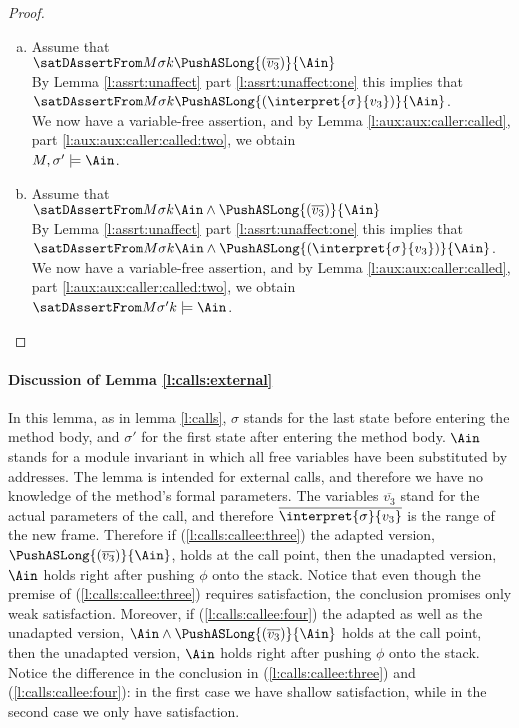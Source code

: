 \begin{proof}
\begin{enumerate}[a.]
\item
Assume that \\
$ \satDAssertFrom M  \sigma k    {\PushASLong  {(\overline {v_3})} {\Ain} }$\\
	By Lemma \ref{l:assrt:unaffect} part \ref{l:assrt:unaffect:one} this  implies that \\
$ \satDAssertFrom M  \sigma k    {\PushASLong  {(\interpret {\sigma} {v_3})} {\Ain} }$.\\
We now have a variable-free assertion, and by Lemma \ref{l:aux:aux:caller:called}, part \ref{l:aux:aux:caller:called:two}, we obtain\\
$ M,  \sigma'    \models \Ain$.
\item
Assume that \\
$ \satDAssertFrom M  \sigma k    {\Ain \wedge \PushASLong  {(\overline {v_3})} {\Ain} }$\\
	By Lemma \ref{l:assrt:unaffect} part \ref{l:assrt:unaffect:one} this  implies that \\
$ \satDAssertFrom M  \sigma k    {\Ain \wedge \PushASLong  {(\interpret {\sigma} {v_3})} {\Ain} }$.\\
We now have a variable-free assertion, and by Lemma \ref{l:aux:aux:caller:called}, part \ref{l:aux:aux:caller:called:two}, we obtain\\
$ \satDAssertFrom M  {\sigma'} k  \models \Ain$.
\end{enumerate}

\end{proof}

\paragraph{Discussion of Lemma \ref{l:calls:external}} In this lemma,  as in  lemma \ref{l:calls}, 
  $\sigma$ stands for the last state before entering the method body, and $\sigma'$ for the first state after entering the method body.
$\Ain$ stands for a module invariant in which all free variables have been substituted by addresses.
The lemma is intended for external calls, and therefore we have no knowledge of the method's formal parameters.
The variables   $\overline {v_3}$ stand for the actual parameters of the call, and therefore 
 $\overline {\interpret {\sigma} {v_3}}$ is the range of the new frame.
Therefore if (\ref{l:calls:callee:three})   the adapted version,
 ${\PushASLong  {(\overline {v_3})} {\Ain} }$, holds  at the call point,
 then the unadapted version, $\Ain$  holds right after pushing $\phi$ onto the stack.
 Notice that  even though the premise of (\ref{l:calls:callee:three}) requires \strong satisfaction, the conclusion promises
 only weak satisfaction.
 Moreover, if (\ref{l:calls:callee:four})   the adapted as well as the unadapted version,
 $\Ain \wedge {\PushASLong  {(\overline {v_3})} {\Ain} }$
 holds  at the call point,
 then the unadapted version, $\Ain$  holds right after pushing $\phi$ onto the stack.
Notice the difference in the conclusion in (\ref{l:calls:callee:three}) and (\ref{l:calls:callee:four}): in the first case we have  shallow satisfaction, while in the second case we only have \strong satisfaction.


